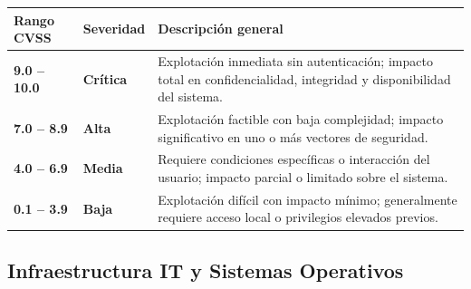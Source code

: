 \documentclass[letterpaper,11pt]{article}
\begin{document}
\begingroup\small
{}
\begin{tabular}{|p{2.8cm}|p{2.8cm}|p{8.0cm}|}
\hline
\rowcolor{gray!25}
\textbf{Rango CVSS} & \textbf{Severidad} & \textbf{Descripción general} \\
\hline
\textbf{9.0 -- 10.0} & \cellcolor{red!30}\textbf{Crítica} & Explotación inmediata sin autenticación; impacto total en confidencialidad, integridad y disponibilidad del sistema. \\
\hline
\textbf{7.0 -- 8.9}  & \cellcolor{orange!40}\textbf{Alta}     & Explotación factible con baja complejidad; impacto significativo en uno o más vectores de seguridad. \\
\hline
\textbf{4.0 -- 6.9}  & \cellcolor{yellow!60}\textbf{Media}    & Requiere condiciones específicas o interacción del usuario; impacto parcial o limitado sobre el sistema. \\
\hline
\textbf{0.1 -- 3.9}  & \cellcolor{green!30}\textbf{Baja}     & Explotación difícil con impacto mínimo; generalmente requiere acceso local o privilegios elevados previos. \\
\hline
\end{tabular}
\endgroup

\vspace{0.3cm}

\vspace{0.3cm}

\subsection{Infraestructura IT y Sistemas Operativos}
\end{document}
